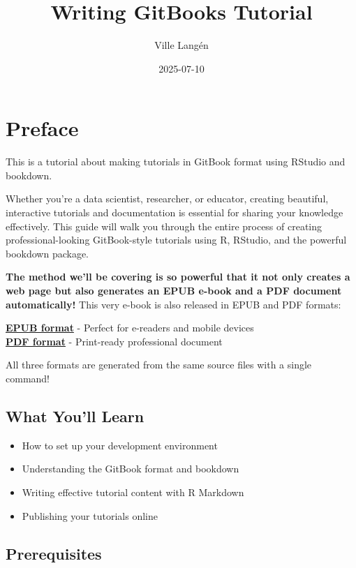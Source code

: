 \documentclass[
]{book}
\title{Writing GitBooks Tutorial}
\author{Ville Langén}
\date{2025-07-10}
\providecommand{\tightlist}{%
  \setlength{\itemsep}{0pt}\setlength{\parskip}{0pt}}
\begin{document}
\maketitle

{
\setcounter{tocdepth}{1}
\tableofcontents
}
\chapter*{Preface}\label{preface}

This is a tutorial about making tutorials in GitBook format using RStudio and bookdown.

Whether you're a data scientist, researcher, or educator, creating beautiful, interactive tutorials and documentation is essential for sharing your knowledge effectively. This guide will walk you through the entire process of creating professional-looking GitBook-style tutorials using R, RStudio, and the powerful bookdown package.

\textbf{The method we'll be covering is so powerful that it not only creates a web page but also generates an EPUB e-book and a PDF document automatically!} This very e-book is also released in EPUB and PDF formats:

\textbf{\href{writing-gitbooks-tutorial.epub}{EPUB format}} - Perfect for e-readers and mobile devices\\
\textbf{\href{writing-gitbooks-tutorial.pdf}{PDF format}} - Print-ready professional document

All three formats are generated from the same source files with a single command!

\section*{What You'll Learn}\label{what-youll-learn}

\begin{itemize}
\tightlist
\item
  How to set up your development environment
\item
  Understanding the GitBook format and bookdown
\item
  Writing effective tutorial content with R Markdown
\item
  Publishing your tutorials online
\end{itemize}

\section*{Prerequisites}\label{prerequisites}
\end{document}
